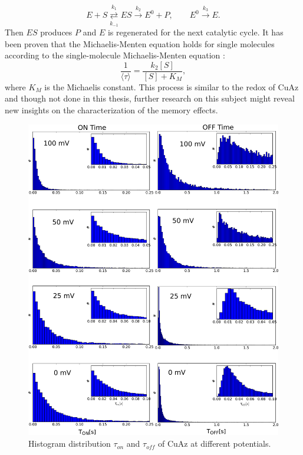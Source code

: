 \documentclass[twoside,single]{lion-msc}
\begin{document}
\begin{equation}\label{MMmech}
E + S \overset{k_{1}}{\underset{k_{-1}}\rightleftarrows} ES \overset{k_{2}}\rightarrow E^{0} + P,  \qquad E^{0} \overset{k_{3}}\rightarrow E.
\end{equation}
Then $ES$ produces $P$ and $E$ is regenerated for the next catalytic cycle. It has been proven that the Michaelis-Menten equation holds for single molecules according to the single-molecule Michaelis-Menten equation \cite{English2006}:
\begin{equation}\label{MMmech}
\frac{1}{\langle \tau \rangle} = \frac{k_{2}[S]}{[S]+K_{M}},
\end{equation}
 where $K_{M}$ is the Michaelis constant. This process is similar to the redox of CuAz and though not done in this thesis, further research on this subject might reveal new insights on the characterization of the memory effects. 

\begin{figure}[ht!]
\centering
\includegraphics[width=.9\textwidth]{Figure_4_4_histogram_thesis}
\caption{Histogram distribution $\tau_{on}$ and $\tau_{off}$ of CuAz at different potentials.}
\label{histograms_disc}
\end{figure}
\end{document}

